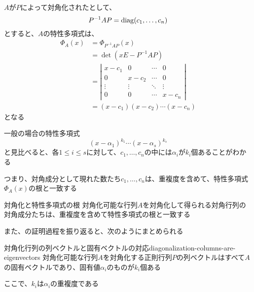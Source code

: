 \documentclass[../../../topic_linear-algebra]{subfiles}
\begin{document}
$A$が$P$によって対角化されたとして、
\begin{equation*}
  P^{-1}AP= \operatorname{diag}(c_1,\ldots, c_n)
\end{equation*}
とすると、$A$の特性多項式は、
\begin{align*}
  \Phi_A(x) & = \Phi_{P^{-1}AP}(x)                          \\
            & = \det(xE - P^{-1}AP)                         \\
            & = \left| \begin{matrix}
                         x - c_1 & 0       & \cdots & 0       \\
                         0       & x - c_2 & \cdots & 0       \\
                         \vdots  & \vdots  & \ddots & \vdots  \\
                         0       & 0       & \cdots & x - c_n
                       \end{matrix} \right| \\
            & = (x - c_1)(x - c_2) \cdots (x - c_n)
\end{align*}
となる

一般の場合の特性多項式
\begin{equation*}
  (x- \alpha_1)^{k_1}\cdots (x - \alpha_s)^{k_s}
\end{equation*}
と見比べると、各$1 \leq i \leq s$に対して、$c_1,\ldots,c_n$の中には$\alpha_i$が$k_i$個あることがわかる

\br

つまり、対角成分として現れた数たち$c_1,\ldots,c_n$は、重複度を含めて、特性多項式$\Phi_A(x)$の根と一致する

\begin{theorem*}{対角化と特性多項式の根}
  対角化可能な行列$A$を対角化して得られる対角行列の対角成分たちは、重複度を含めて特性多項式の根と一致する
\end{theorem*}

また、の証明過程を振り返ると、次のようにまとめられる

\begin{theorem}{対角化行列の列ベクトルと固有ベクトルの対応}{diagonalization-columns-are-eigenvectors}
  対角化可能な行列$A$を対角化する正則行列$P$の列ベクトルはすべて$A$の固有ベクトルであり、固有値$\alpha_i$のものが$k_i$個ある

  ここで、$k_i$は$\alpha_i$の重複度である
\end{theorem}
\end{document}
